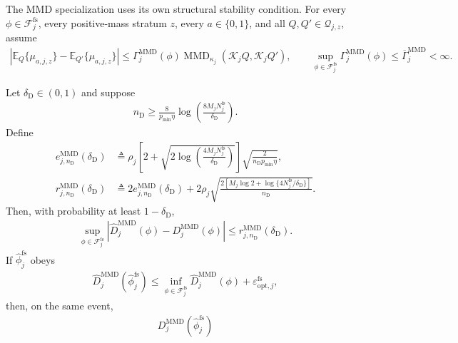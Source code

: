 The MMD specialization uses its own structural stability condition. For every $\phi\in\mathcal F_j^{\mathrm{fs}}$, every positive-mass stratum $z$, every $a\in\{0,1\}$, and all $Q,Q'\in\mathcal Q_{j,z}$, assume
\begin{align}
\left|\mathbb E_Q\{\mu_{a,j,z}\}-\mathbb E_{Q'}\{\mu_{a,j,z}\}\right|
\le
\Gamma_j^{\mathrm{MMD}}(\phi)
\operatorname{MMD}_{\kappa_j}(\mathcal K_jQ,\mathcal K_jQ'),
\qquad
\sup_{\phi\in\mathcal F_j^{\mathrm{fs}}}
\Gamma_j^{\mathrm{MMD}}(\phi)
\le\overline\Gamma_j^{\mathrm{MMD}}<\infty.
\label{eq:finite-mmd-stability}
\end{align}

\begin{proposition}
\label{prop:finite-strata-mmd-learning-bound}
Let $\delta_{\mathrm D}\in(0,1)$ and suppose
\begin{align}
n_{\mathrm D}
\ge
\frac{8}{p_{\min}\eta}
\log\left(\frac{8M_jN_j^{\mathrm{fs}}}{\delta_{\mathrm D}}\right).
\label{eq:finite-mmd-sample-threshold}
\end{align}
Define
\begin{align}
e_{j,n_{\mathrm D}}^{\mathrm{MMD}}(\delta_{\mathrm D})
&\triangleq
\rho_j
\left[
2+\sqrt{2\log\left(\frac{4M_jN_j^{\mathrm{fs}}}{\delta_{\mathrm D}}\right)}
\right]
\sqrt{\frac{2}{n_{\mathrm D}p_{\min}\eta}},\\
r_{j,n_{\mathrm D}}^{\mathrm{MMD}}(\delta_{\mathrm D})
&\triangleq
2e_{j,n_{\mathrm D}}^{\mathrm{MMD}}(\delta_{\mathrm D})
+2\rho_j
\sqrt{
\frac{
2\left[M_j\log2+\log\{4N_j^{\mathrm{fs}}/\delta_{\mathrm D}\}\right]
}{n_{\mathrm D}}
}.
\label{eq:finite-mmd-radius}
\end{align}
Then, with probability at least $1-\delta_{\mathrm D}$,
\begin{align}
\sup_{\phi\in\mathcal F_j^{\mathrm{fs}}}
\left|
\widehat D_j^{\mathrm{MMD}}(\phi)-D_j^{\mathrm{MMD}}(\phi)
\right|
\le
r_{j,n_{\mathrm D}}^{\mathrm{MMD}}(\delta_{\mathrm D}).
\label{eq:finite-mmd-uniform-deviation}
\end{align}
If $\widehat\phi_j^{\mathrm{fs}}$ obeys
\begin{align}
\widehat D_j^{\mathrm{MMD}}(\widehat\phi_j^{\mathrm{fs}})
\le
\inf_{\phi\in\mathcal F_j^{\mathrm{fs}}}
\widehat D_j^{\mathrm{MMD}}(\phi)
+\varepsilon_{\mathrm{opt},j}^{\mathrm{fs}},
\label{eq:finite-mmd-approximate-erm}
\end{align}
then, on the same event,
\begin{align}
D_j^{\mathrm{MMD}}(\widehat\phi_j^{\mathrm{fs}})

\end{align}
\end{proposition}
